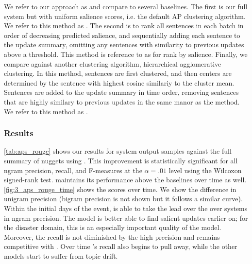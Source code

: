     We refer to our approach as \sap{} and compare to 
    several 
    baselines.
    The first is our full system but with uniform salience scores, i.e.
    the default AP clustering algorithm. We refer to
    this method as \ap.
    The second is to rank all sentences in each batch in order of decreasing
    predicted
    salience, and sequentially adding each sentence to the update summary, 
    omitting
    any sentences with similarity to previous updates above a threshold.
    This method is reference to as \ranksal{} for rank by salience.
    Finally, we compare against another clustering algorithm,
    hierarchical agglomerative clustering.
    In this method, sentences are first clustered, 
    and then centers are determined by the sentence
    with  highest  cosine  similariy  to  the  cluster
    mean. 
    Sentences are added to the update summary in time order, 
    removing sentences that are highly similary to previous updates in the
    same manor as the \ranksal{} method. We refer to this method as 
    \hac.





    \subsubsection{Results}

\autoref{tab:aps_rouge}  shows  our  results  for  system  output
samples against the full summary of nuggets using \rouge. 
This improvement is statistically significant  for  all  ngram  
precision,  recall,  and  F-measures at the
$\alpha=.01$
level using the Wilcoxon
signed-rank test.
\sap{}
maintains    its    performance
above  the  baselines  over  time  as  well.
\autoref{fig:3_aps_rouge_time}  shows  the    scores  over  
time.
We  show  the  difference  in  unigram  precision
(bigram  precision  is  not  shown  but  it  follows a
similar  curve).
Within  the  initial  days  of  the
event,  \sap{}
is  able  to  take  the  lead
over  the  over  systems  in  ngram  precision.   The
\sap{}
model is better able to find salient
updates earlier on; for the disaster domain, this is
an especially important quality of the model.
Moreover, the \sap{} recall is not diminished by the high 
precision and remains competitive with \ap. 
Over time \sap's recall also begins to pull away, 
while the other models start to suffer from topic drift.


